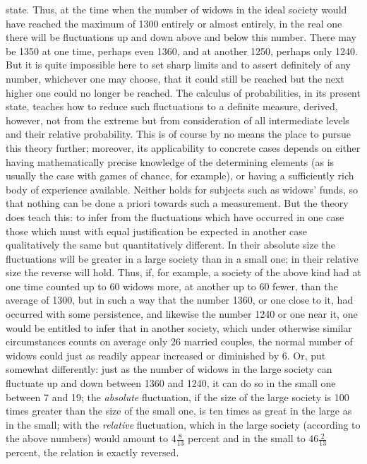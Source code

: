 state. Thus, at the time when the number of widows in the ideal society would have reached the maximum of 1300 entirely or almost entirely, in the real one there will be fluctuations up and down above and below this number. There may be 1350 at one time, perhaps even 1360, and at another 1250, perhaps only 1240. But it is quite impossible here to set sharp limits and to assert definitely of any number, whichever one may choose, that it could still be reached but the next higher one could no longer be reached. The calculus of probabilities, in its present state, teaches how to reduce such fluctuations to a definite measure, derived, however, not from the extreme but from consideration of all intermediate levels and their relative probability. This is of course by no means the place to pursue this theory further; moreover, its applicability to concrete cases depends on either having mathematically precise knowledge of the determining elements (as is usually the case with games of chance, for example), or having a sufficiently rich body of experience available. Neither holds for subjects such as widows' funds, so that nothing can be done a priori towards such a measurement. But the theory does teach this: to infer from the fluctuations which have occurred in one case those which must with equal justification be expected in another case qualitatively the same but quantitatively different. In their absolute size the fluctuations will be greater in a large society than in a small one; in their relative size the reverse will hold. Thus, if, for example, a society of the above kind had at one time counted up to 60 widows more, at another up to 60 fewer, than the average of 1300, but in such a way that the number 1360, or one close to it, had occurred with some persistence, and likewise the number 1240 or one near it, one would be entitled to infer that in another society, which under otherwise similar circumstances counts on average only 26 married couples, the normal number of widows could just as readily appear increased or diminished by 6. Or, put somewhat differently: just as the number of widows in the large society can fluctuate up and down between 1360 and 1240, it can do so in the small one between 7 and 19; the \textit{absolute} fluctuation, if the size of the large society is 100 times greater than the size of the small one, is ten times as great in the large as in the small; with the \textit{relative} fluctuation, which in the large society (according to the above numbers) would amount to \(4\tfrac8{13}\) percent and in the small to \(46\tfrac2{13}\) percent, the relation is exactly reversed.

